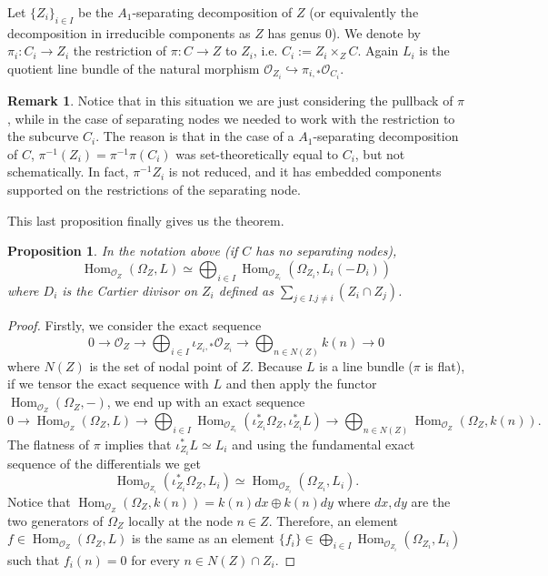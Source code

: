 \documentclass{alggeom}
\numberwithin{equation}{section}
\numberwithin{subsection}{section}
\newtheorem{proposition}[theorem]{Proposition}
\theoremstyle{definition}
\newtheorem{remark}[theorem]{Remark}
\theoremstyle{remark}
\newcommand\cO{\mathcal{O}} \newcommand\cP{\mathcal{P}}
\renewcommand\hom{\operatorname{Hom}}
\begin{document}
Let $\{ Z_i \}_{i \in I}$ be the $A_1$-separating decomposition of $Z$ (or equivalently the decomposition in irreducible components as $Z$ has genus 0). We denote by $\pi_i:C_i \rightarrow Z_i$ the restriction of $\pi:C\rightarrow Z$ to $Z_i$, i.e. $C_i:=Z_i\times_Z C$. Again $L_i$ is the quotient line bundle of the natural morphism $\cO_{Z_i} \hookrightarrow \pi_{i,*}\cO_{C_i}$. 

\begin{remark}
 	Notice that in this situation we are just considering the pullback of $\pi$, while in the case of separating nodes we needed to work with the restriction to the subcurve $C_i$. The reason is that in the case of a $A_1$-separating decomposition of $C$, $\pi^{-1}(Z_i)=\pi^{-1}\pi(C_i)$ was set-theoretically equal to $C_i$, but not schematically. In fact, $\pi^{-1}Z_i$ is not reduced, and it has embedded components supported on the restrictions of the separating node. 
\end{remark}

This last proposition finally gives us the theorem.
\begin{proposition}
	In the notation above (if $C$ has no separating nodes),
	$$\hom_{\cO_Z}(\Omega_{Z},L) \simeq \bigoplus_{i \in I}\hom_{\cO_{Z_i}}(\Omega_{Z_i},L_i(-D_i))$$
	where $D_i$ is the Cartier divisor on $Z_i$ defined as $\sum_{j \in I. j \neq i}(Z_i \cap Z_j)$.
\end{proposition}


\begin{proof}
  Firstly, we consider the exact sequence
  $$ 0 \rightarrow \cO_Z \rightarrow \bigoplus_{i \in I}\iota_{Z_i,*} \cO_{Z_i} \rightarrow \bigoplus_{n \in N(Z)}k(n) \rightarrow 0 $$
  where $N(Z)$ is the set of nodal point of $Z$.
  Because $L$ is a line bundle ($\pi$ is flat), if we tensor the exact sequence with $L$ and then apply the functor $\hom_{\cO_Z}(\Omega_{Z},-)$, we end up with an exact sequence
  $$ 0 \rightarrow \hom_{\cO_Z}(\Omega_{Z},L) \rightarrow \bigoplus_{i \in I}\hom_{\cO_{Z_i}}(\iota_{Z_i}^*\Omega_Z,\iota_{Z_i}^*L) \rightarrow \bigoplus_{n \in N(Z)}\hom_{\cO_Z}(\Omega_Z,k(n)). $$
  The flatness of $\pi$ implies that $\iota_{Z_i}^*L \simeq L_{i}$ and using the fundamental exact sequence of the differentials we get
  $$\hom_{\cO_{Z_i}}(\iota_{Z_i}^*\Omega_Z,L_i) \simeq \hom_{\cO_{Z_i}}(\Omega_{Z_i},L_i).$$
  Notice that $\hom_{\cO_Z}(\Omega_{Z},k(n))=k(n)dx\oplus k(n)dy$ where $dx,dy$ are the two generators of $\Omega_Z$ locally at the node $n \in Z$. Therefore, an element $f \in \hom_{\cO_Z}(\Omega_{Z},L)$ is the same as an element $\{f_i\} \in \bigoplus_{i \in I}\hom_{\cO_{Z_i}}(\Omega_{Z_i},L_i)$ such that $f_i(n)=0$ for every $n \in N(Z) \cap Z_i$.
\end{proof}
\end{document}
